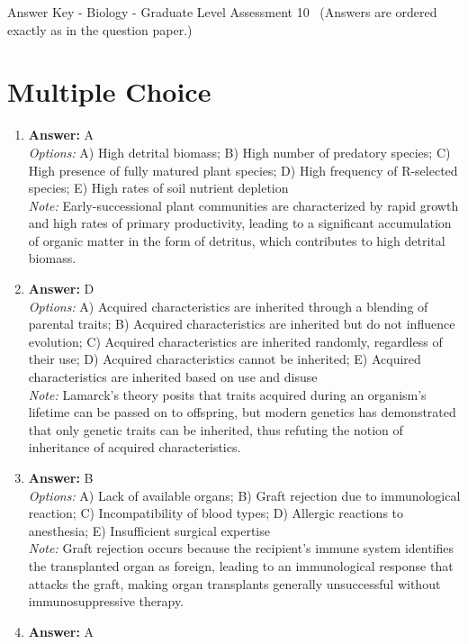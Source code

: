 \documentclass[12pt]{article}
\begin{document}
\begin{center}
Answer Key - Biology - Graduate Level Assessment 10 \
\small (Answers are ordered exactly as in the question paper.)
\end{center}

\section*{Multiple Choice}
\begin{enumerate}[label=\arabic*.]
\item \textbf{Answer:} A
\\ \textit{Options:} A) High detrital biomass; B) High number of predatory species; C) High presence of fully matured plant species; D) High frequency of R-selected species; E) High rates of soil nutrient depletion
\\ \textit{Note:} Early-successional plant communities are characterized by rapid growth and high rates of primary productivity, leading to a significant accumulation of organic matter in the form of detritus, which contributes to high detrital biomass.
\item \textbf{Answer:} D
\\ \textit{Options:} A) Acquired characteristics are inherited through a blending of parental traits; B) Acquired characteristics are inherited but do not influence evolution; C) Acquired characteristics are inherited randomly, regardless of their use; D) Acquired characteristics cannot be inherited; E) Acquired characteristics are inherited based on use and disuse
\\ \textit{Note:} Lamarck's theory posits that traits acquired during an organism's lifetime can be passed on to offspring, but modern genetics has demonstrated that only genetic traits can be inherited, thus refuting the notion of inheritance of acquired characteristics.
\item \textbf{Answer:} B
\\ \textit{Options:} A) Lack of available organs; B) Graft rejection due to immunological reaction; C) Incompatibility of blood types; D) Allergic reactions to anesthesia; E) Insufficient surgical expertise
\\ \textit{Note:} Graft rejection occurs because the recipient's immune system identifies the transplanted organ as foreign, leading to an immunological response that attacks the graft, making organ transplants generally unsuccessful without immunosuppressive therapy.
\item \textbf{Answer:} A

\end{enumerate}
\end{document}
